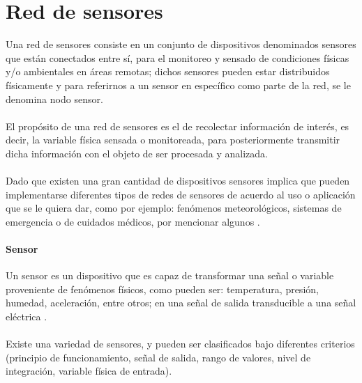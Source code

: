 \pagebreak



\section{Red de sensores}
Una red de sensores consiste en un conjunto de dispositivos denominados sensores que están conectados entre sí, para el monitoreo y sensado de condiciones físicas y/o ambientales en áreas remotas; dichos sensores pueden estar distribuidos físicamente y para referirnos a un sensor en específico como parte de la red, se le denomina nodo sensor. 
\paragraph{}
El propósito de una red de sensores es el de recolectar información de interés, es decir, la variable física sensada o monitoreada, para posteriormente transmitir dicha información con el objeto de ser procesada y analizada. 
\paragraph{}
Dado que existen una gran cantidad de dispositivos sensores implica que pueden implementarse diferentes tipos de redes de sensores de acuerdo al uso o aplicación que se le quiera dar, como por ejemplo: fenómenos meteorológicos, sistemas de emergencia o de cuidados médicos, por mencionar algunos \citep{MarcoTeorico16}.

\paragraph{Sensor}
Un sensor es un dispositivo que es capaz de transformar una señal o variable proveniente de fenómenos físicos, como pueden ser: temperatura, presión, humedad, aceleración, entre otros; en una señal de salida transducible a una señal eléctrica \citep{MarcoTeorico20} .
\paragraph{}
Existe una variedad de sensores, y pueden ser clasificados bajo diferentes criterios (principio de funcionamiento, señal de salida, rango de valores, nivel de integración, variable física de entrada).

